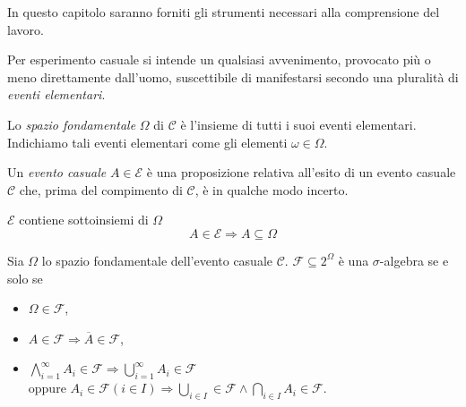 

In questo capitolo saranno forniti gli strumenti necessari alla comprensione del lavoro.

\begin{mtdef}
	Per esperimento casuale si intende un qualsiasi avvenimento, provocato più o meno direttamente dall'uomo, suscettibile di manifestarsi secondo una pluralità di \emph{eventi elementari}.
\end{mtdef}

\begin{mtdef}
	Lo \emph{spazio fondamentale} $\Omega$ di $\mathcal{C}$ è l'insieme di tutti i suoi eventi elementari. Indichiamo tali eventi elementari come gli elementi $\omega \in \Omega$.
\end{mtdef}

\begin{mtdef}
	Un \emph{evento casuale} $A \in \mathcal{E}$ è una proposizione relativa all'esito di un evento casuale $\mathcal{C}$ che, prima del compimento di $\mathcal{C}$, è in qualche modo incerto.
\end{mtdef}

\begin{mtobs}
	$\mathcal{E}$ contiene sottoinsiemi di $\Omega$
	$$ A \in \mathcal{E} \Rightarrow A \subseteq \Omega $$
\end{mtobs}

\begin{mtdef}
	Sia $\Omega$ lo spazio fondamentale dell'evento casuale $\mathcal{C}$. $\mathcal{F} \subseteq 2^\Omega$ è una $\sigma$-algebra se e solo se
	\begin{itemize}
		\item $\Omega \in \mathcal{F}$,
		\item $A \in \mathcal{F} \Rightarrow \overline{A} \in \mathcal{F}$,
		\item $\bigwedge_{i=1}^{\infty} A_i \in \mathcal{F} \Rightarrow \bigcup_{i=1}^\infty A_i \in \mathcal{F}$ \\ oppure $A_i \in \mathcal{F} (i \in I) \Rightarrow \bigcup_{i \in I} \in \mathcal{F} \wedge \bigcap_{i \in I} A_i \in \mathcal{F}$.
	\end{itemize}
\end{mtdef}

